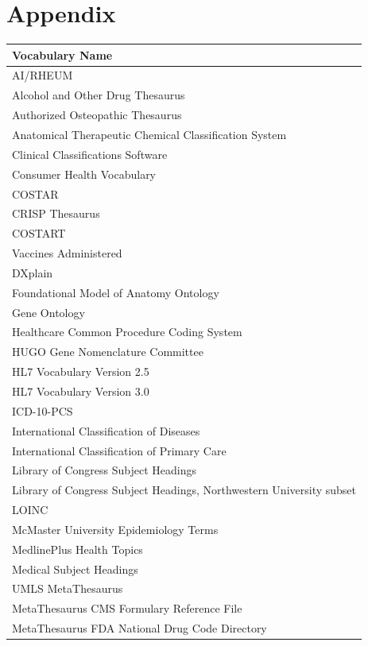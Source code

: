 \documentclass[Report.tex]{subfiles}
\begin{document}
\newpage
\chapter{Appendix}
\setcounter{page}{1}
\setcounter{table}{0}
\setcounter{figure}{0}
\setcounter{section}{0}
\renewcommand{\thetable}{A\arabic{table}}
\renewcommand{\thefigure}{A\arabic{figure}}

\begin{longtable}{| p{} |}\hline
\textbf{Vocabulary Name}\\ \hline
AI/RHEUM\\
Alcohol and Other Drug Thesaurus\\
Authorized Osteopathic Thesaurus\\
Anatomical Therapeutic Chemical Classification System\\
Clinical Classifications Software\\
Consumer Health Vocabulary\\
COSTAR\\
CRISP Thesaurus\\
COSTART\\
Vaccines Administered\\
DXplain\\
Foundational Model of Anatomy Ontology\\
Gene Ontology\\
Healthcare Common Procedure Coding System\\
HUGO Gene Nomenclature Committee\\
HL7 Vocabulary Version 2.5\\
HL7 Vocabulary Version 3.0\\
ICD-10-PCS\\
International Classification of Diseases\\
International Classification of Primary Care\\
Library of Congress Subject Headings\\
Library of Congress Subject Headings, Northwestern University subset\\
LOINC\\
McMaster University Epidemiology Terms\\
MedlinePlus Health Topics\\
Medical Subject Headings\\
UMLS MetaThesaurus\\
MetaThesaurus CMS Formulary Reference File\\
MetaThesaurus FDA National Drug Code Directory\\

\end{longtable}
\end{document}
